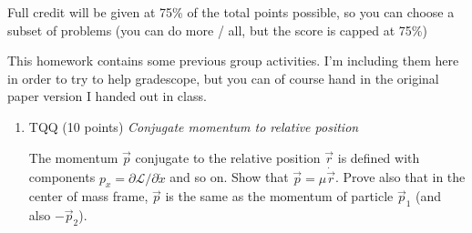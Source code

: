 \documentclass[12pt]{article}
\newcommand{\soln}[2] {\textit{Solution:} #2}
\begin{document}
Full credit will be given at 75\% of the total points possible, so you can choose a subset of problems (you can do more / all, but the score is capped at 75\%)

This homework contains some previous group activities. I'm including them here in order to try to help gradescope, but you can of course hand in the original paper version I handed out in class.

\clearpage

\begin{enumerate}










      \item TQQ (10 points) \textit{Conjugate momentum to relative position}

            The momentum $\vec p$ conjugate to the relative position $\vec r$ is defined with components $p_x = \partial\mathcal{L}/\partial \dot x$ and so on. Show that $\vec p = \mu \dot{\vec r}$. Prove also that in the center of mass frame, $\vec p$ is the same as the momentum of particle $\vec p_1$ (and also $-\vec p_2$).


\end{enumerate}
\end{document}
